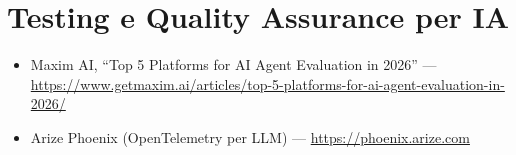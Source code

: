 \section{Testing e Quality Assurance per IA}

\begin{itemize}
  \item Maxim AI, ``Top 5 Platforms for AI Agent Evaluation in 2026'' ---\\
    \url{https://www.getmaxim.ai/articles/top-5-platforms-for-ai-agent-evaluation-in-2026/}
  \item Arize Phoenix (OpenTelemetry per LLM) --- \url{https://phoenix.arize.com}
\end{itemize}
